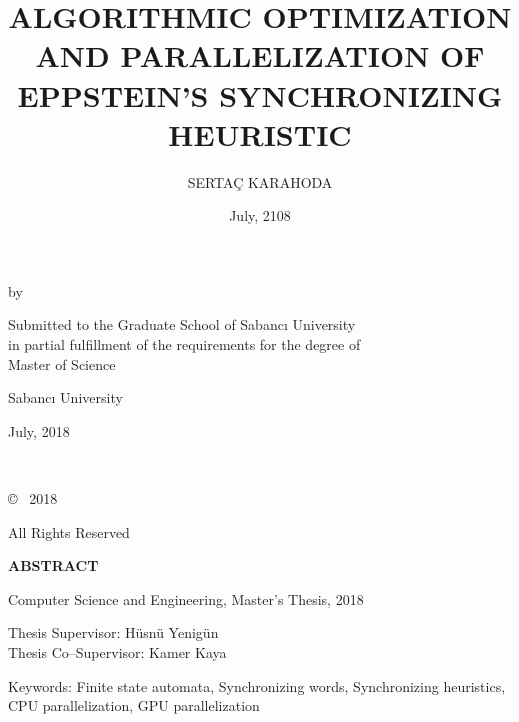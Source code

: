 \documentclass[12pt, a4paper]{report}
\title{ALGORITHMIC OPTIMIZATION AND PARALLELIZATION OF EPPSTEIN'S SYNCHRONIZING HEURISTIC}
\author{SERTAÇ KARAHODA}
\date{July, 2108}
\begin{document}

\begin{center}

\vspace*{6\baselineskip}

\MyTitle

\vspace*{6\baselineskip}

by

\MyAuthor

\vspace*{6\baselineskip}

Submitted to the Graduate School of Sabancı University \\
in partial fulfillment of the requirements for the degree of \\
Master of Science

\vspace*{1\baselineskip}

Sabancı University

July, 2018
\end{center}


\clearpage
$ $
\thispagestyle{empty}
\clearpage
$ $
\vspace{5cm}
\begin{center}
\copyright \hspace{0.1cm} \MyAuthor\ 2018

All Rights Reserved
\thispagestyle{empty}
\end{center}
\clearpage



\setcounter{page}{4}


\begin{center}
{\bf ABSTRACT}
\end{center}

\begin{center}
\large
\MyTitle
\end{center}

\begin{center}
\MyAuthor

Computer Science and Engineering, Master's Thesis, 2018

Thesis Supervisor: Hüsnü Yenigün\\
Thesis Co--Supervisor: Kamer Kaya
\end{center}

\begin{center}
Keywords: Finite state automata, Synchronizing words, Synchronizing heuristics, CPU parallelization, GPU parallelization
\end{center}
\end{document}
